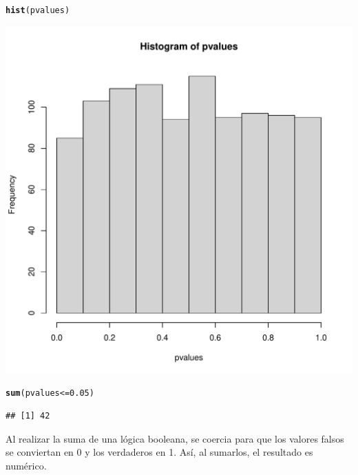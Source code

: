 \documentclass{config/apuntes}\usepackage[]{graphicx}\usepackage[]{xcolor}
\makeatletter
\def\maxwidth{ %
  \ifdim\Gin@nat@width>\linewidth
    \linewidth
  \else
    \Gin@nat@width
  \fi
}
\newcommand{\hlnum}[1]{\textcolor[rgb]{0.686,0.059,0.569}{#1}}%
\newcommand{\hlopt}[1]{\textcolor[rgb]{0,0,0}{#1}}%
\newcommand{\hldef}[1]{\textcolor[rgb]{0.345,0.345,0.345}{#1}}%
\newcommand{\hlkwd}[1]{\textcolor[rgb]{0.737,0.353,0.396}{\textbf{#1}}}%
\newenvironment{kframe}{%
 \def\at@end@of@kframe{}%
 \ifinner\ifhmode%
  \def\at@end@of@kframe{\end{minipage}}%
  \begin{minipage}{\columnwidth}%
 \fi\fi%
 \def\FrameCommand##1{\hskip\@totalleftmargin \hskip-\fboxsep
 \colorbox{shadecolor}{##1}\hskip-\fboxsep
     \hskip-\linewidth \hskip-\@totalleftmargin \hskip\columnwidth}%
 \MakeFramed {\advance\hsize-\width
   \@totalleftmargin\z@ \linewidth\hsize
   \@setminipage}}%
 {\par\unskip\endMakeFramed%
 \at@end@of@kframe}
\newenvironment{knitrout}{}{} %
\makeatother
\begin{document}
\begin{knitrout}
\color{fgcolor}\begin{kframe}
\begin{alltt}
\hlkwd{hist}\hldef{(pvalues)}
\end{alltt}
\end{kframe}
\includegraphics[width=\maxwidth]{figure/unnamed-chunk-7-1} 
\begin{kframe}\begin{alltt}
\hlkwd{sum}\hldef{(pvalues} \hlopt{<=} \hlnum{0.05}\hldef{)}
\end{alltt}
\begin{verbatim}
## [1] 42
\end{verbatim}
\end{kframe}
\end{knitrout}

Al realizar la suma de una lógica booleana, se coercia para que los valores falsos se conviertan en 0 y los verdaderos en 1. Así, al sumarlos, el resultado es numérico. 
\end{document}
